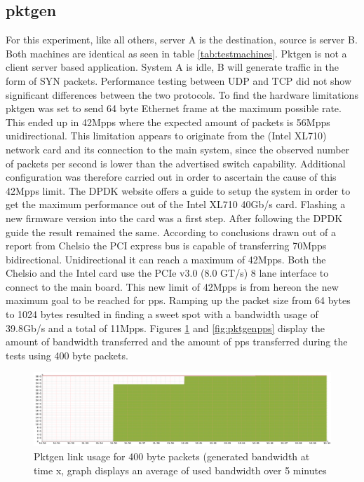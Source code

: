 \subsection{pktgen}\label{sub:pktgen}
For this experiment, like all others, server A is the destination, source is server B. Both machines are identical as seen in table \ref{tab:testmachines}. Pktgen is not a client server based application. System A is idle, B will generate traffic in the form of SYN packets. Performance testing between UDP and TCP did not show significant differences between the two protocols. To find the hardware limitations pktgen was set to send 64 byte Ethernet frame at the maximum possible rate.\\ 
This ended up in 42Mpps where the expected amount of packets is 56Mpps unidirectional. 
This limitation appears to originate from the (Intel XL710) network card and its connection to the main system, since the observed number of packets per second is lower than the advertised switch capability. 
Additional configuration was therefore carried out in order to ascertain the cause of this 42Mpps limit. 
The DPDK website offers a guide \cite{intelguidedpdk} to setup the system in order to get the maximum performance out of the Intel XL710 40Gb/s card. 
Flashing a new firmware version into the card was a first step. 
After following the DPDK guide the result remained the same. 
According to conclusions drawn out of a report from Chelsio \cite{chelsio} the PCI express bus is capable of transferring 70Mpps bidirectional. 
Unidirectional it can reach a maximum of 42Mpps.
Both the Chelsio\cite{t580} and the Intel\cite{xl710} card use the PCIe v3.0 (8.0 GT/s) 8 lane interface to connect to the main board.
This new limit of 42Mpps is from hereon the new maximum goal to be reached for pps.   
Ramping up the packet size from 64 bytes to 1024 bytes resulted in finding a sweet spot with a bandwidth usage of 39.8Gb/s and a total of 11Mpps. Figures \ref{fig:pktgenlink} and \ref{fig:pktgenpps} display the amount of bandwidth transferred and the amount of pps transferred during the tests using 400 byte packets. 

\begin{figure}
  \includegraphics[scale=0.35]{images/pktgen_link_usage.png}
  \caption{Pktgen link usage for 400 byte packets (generated bandwidth at time x, graph displays an average of used bandwidth over 5 minutes}
  \label{fig:pktgenlink}
\end{figure}

